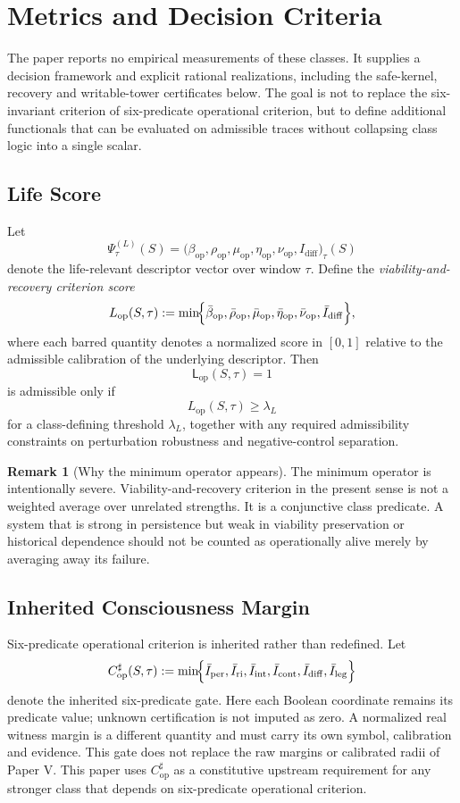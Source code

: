 \documentclass[11pt,a4paper]{article}
\theoremstyle{definition}
\newtheorem{remark}[proposition]{Remark}
\newcommand{\Lop}{\mathsf{L}_{\mathrm{op}}}
\newcommand{\PsiVec}{\Psi}
\newcommand{\Iper}{I_{\mathrm{per}}}
\newcommand{\Iri}{I_{\mathrm{ri}}}
\newcommand{\Iint}{I_{\mathrm{int}}}
\newcommand{\Icont}{I_{\mathrm{cont}}}
\newcommand{\Idiff}{I_{\mathrm{diff}}}
\newcommand{\Ileg}{I_{\mathrm{leg}}}
\newcommand{\Bound}{\beta_{\mathrm{op}}}
\newcommand{\Persist}{\rho_{\mathrm{op}}}
\newcommand{\Maint}{\mu_{\mathrm{op}}}
\newcommand{\HistDep}{\eta_{\mathrm{op}}}
\newcommand{\Viab}{\nu_{\mathrm{op}}}
\begin{document}
\section{Metrics and Decision Criteria}
The paper reports no empirical measurements of these classes. It supplies a decision framework and explicit rational realizations, including the safe-kernel, recovery and writable-tower certificates below. The goal is not to replace the six-invariant criterion of six-predicate operational criterion, but to define additional functionals that can be evaluated on admissible traces without collapsing class logic into a single scalar.

\subsection{Life Score}
Let
\[
\PsiVec^{(L)}_\tau(S)=\bigl(\Bound,\Persist,\Maint,\HistDep,\Viab,\Idiff\bigr)_\tau(S)
\]
denote the life-relevant descriptor vector over window $\tau$. Define the \emph{viability-and-recovery criterion score}
\[
L_{\mathrm{op}}(S,\tau)
:=
\min\!\Bigl\{
\bar\Bound,\bar\Persist,\bar\Maint,\bar\HistDep,\bar\Viab,\bar\Idiff
\Bigr\},
\]
where each barred quantity denotes a normalized score in $[0,1]$ relative to the admissible calibration of the underlying descriptor. Then
\[
\Lop(S,\tau)=1
\]
is admissible only if
\[
L_{\mathrm{op}}(S,\tau)\ge \lambda_L
\]
for a class-defining threshold $\lambda_L$, together with any required admissibility constraints on perturbation robustness and negative-control separation.

\begin{remark}[Why the minimum operator appears]
The minimum operator is intentionally severe. Viability-and-recovery criterion in the present sense is not a weighted average over unrelated strengths. It is a conjunctive class predicate. A system that is strong in persistence but weak in viability preservation or historical dependence should not be counted as operationally alive merely by averaging away its failure.
\end{remark}

\subsection{Inherited Consciousness Margin}
Six-predicate operational criterion is inherited rather than redefined. Let
\[
C_{\mathrm{op}}^{\sharp}(S,\tau)
:=
\min\!\Bigl\{
\bar\Iper,\bar\Iri,\bar\Iint,\bar\Icont,\bar\Idiff,\bar\Ileg
\Bigr\}
\]
denote the inherited six-predicate gate. Here each Boolean coordinate remains its predicate value; unknown certification is not imputed as zero. A normalized real witness margin is a different quantity and must carry its own symbol, calibration and evidence. This gate does not replace the raw margins or calibrated radii of Paper V. This paper uses $C_{\mathrm{op}}^{\sharp}$ as a constitutive upstream requirement for any stronger class that depends on six-predicate operational criterion.
\end{document}

